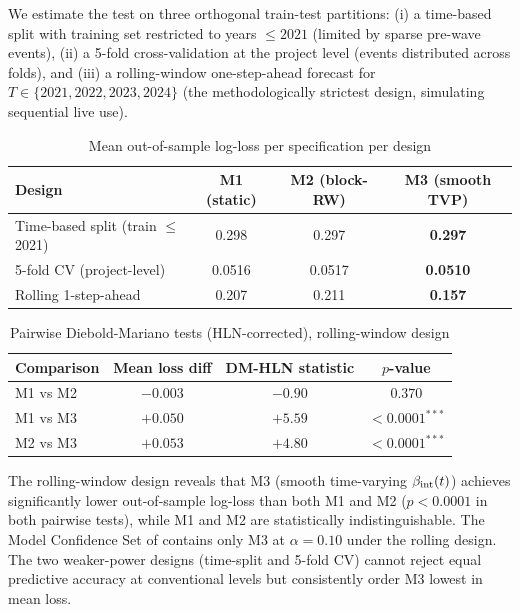 We estimate the test on three orthogonal train-test partitions: (i) a time-based split with training set restricted to years $\leq 2021$ (limited by sparse pre-wave events), (ii) a 5-fold cross-validation at the project level (events distributed across folds), and (iii) a rolling-window one-step-ahead forecast for $T \in \{2021, 2022, 2023, 2024\}$ (the methodologically strictest design, simulating sequential live use).

\begin{table}[!htbp]
\centering
\caption{Mean out-of-sample log-loss per specification per design}
\label{tab:ch7-dm-mean-loss}
\begin{tabular}{lccc}
\toprule
Design & M1 (static) & M2 (block-RW) & M3 (smooth TVP) \\
\midrule
Time-based split (train $\leq$ 2021) & 0.298 & 0.297 & \textbf{0.297} \\
5-fold CV (project-level) & 0.0516 & 0.0517 & \textbf{0.0510} \\
Rolling 1-step-ahead & 0.207 & 0.211 & \textbf{0.157} \\
\bottomrule
\end{tabular}
\end{table}

\begin{table}[!htbp]
\centering
\caption{Pairwise Diebold-Mariano tests (HLN-corrected), rolling-window design}
\label{tab:ch7-dm-pairs}
\begin{tabular}{lccc}
\toprule
Comparison & Mean loss diff & DM-HLN statistic & $p$-value \\
\midrule
M1 vs M2 & $-0.003$ & $-0.90$ & $0.370$ \\
M1 vs M3 & $+0.050$ & $+5.59$ & $< 0.0001^{\ast\ast\ast}$ \\
M2 vs M3 & $+0.053$ & $+4.80$ & $< 0.0001^{\ast\ast\ast}$ \\
\bottomrule
\end{tabular}
\end{table}

The rolling-window design reveals that M3 (smooth time-varying $\beta_{\mathrm{int}}(t)$) achieves significantly lower out-of-sample log-loss than both M1 and M2 ($p < 0.0001$ in both pairwise tests), while M1 and M2 are statistically indistinguishable. The Model Confidence Set of \cite{hansen2011model} contains only M3 at $\alpha = 0.10$ under the rolling design. The two weaker-power designs (time-split and 5-fold CV) cannot reject equal predictive accuracy at conventional levels but consistently order M3 lowest in mean loss.

